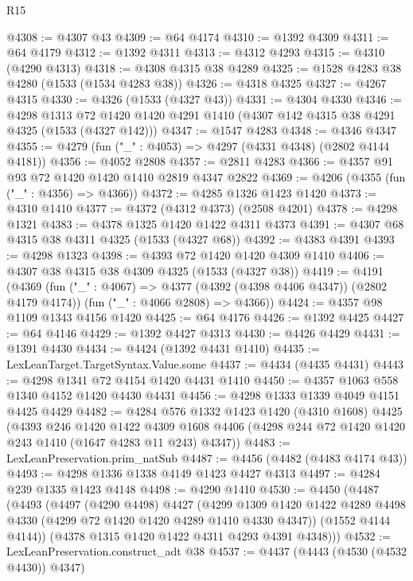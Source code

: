 \begin{lexlean}{R15}
\begin{coremodule}
@4308 := @4307 @43
@4309 := @64 @4174
@4310 := @1392 @4309
@4311 := @64 @4179
@4312 := @1392 @4311
@4313 := @4312 @4293
@4315 := @4310 (@4290 @4313)
@4318 := @4308 @4315 @38 @4289
@4325 := @1528 @4283 @38 @4280 (@1533 (@1534 @4283 @38))
@4326 := @4318 @4325
@4327 := @4267 @4315
@4330 := @4326 (@1533 (@4327 @43))
@4331 := @4304 @4330
@4346 := @4298
    @1313
    @72
    @1420
    @1420
    @4291
    @1410
    (@4307 @142 @4315 @38 @4291 @4325 (@1533 (@4327 @142)))
@4347 := @1547 @4283
@4348 := @4346 @4347
@4355 := @4279 (fun ("_" : @4053) => @4297 (@4331 @4348) (@2802 @4144 @4181))
@4356 := @4052 @2808
@4357 := @2811 @4283
@4366 := @4357 @91 @93 @72 @1420 @1420 @1410 @2819 @4347 @2822
@4369 := @4206 (@4355 (fun ("_" : @4356) => @4366))
@4372 := @4285 @1326 @1423 @1420
@4373 := @4310 @1410
@4377 := @4372 (@4312 @4373) (@2508 @4201)
@4378 := @4298 @1321
@4383 := @4378 @1325 @1420 @1422 @4311 @4373
@4391 := @4307 @68 @4315 @38 @4311 @4325 (@1533 (@4327 @68))
@4392 := @4383 @4391
@4393 := @4298 @1323
@4398 := @4393 @72 @1420 @1420 @4309 @1410
@4406 := @4307 @38 @4315 @38 @4309 @4325 (@1533 (@4327 @38))
@4419 := @4191
    (@4369
      (fun ("_" : @4067) => @4377 (@4392 (@4398 @4406 @4347)) (@2802 @4179 @4174))
      (fun ("_" : @4066 @2808) => @4366))
@4424 := @4357 @98 @1109 @1343 @4156 @1420
@4425 := @64 @4176
@4426 := @1392 @4425
@4427 := @64 @4146
@4429 := @1392 @4427 @4313
@4430 := @4426 @4429
@4431 := @1391 @4430
@4434 := @4424 (@1392 @4431 @1410)
@4435 := LexLeanTarget.TargetSyntax.Value.some
@4437 := @4434 (@4435 @4431)
@4443 := @4298 @1341 @72 @4154 @1420 @4431 @1410
@4450 := @4357 @1063 @558 @1340 @4152 @1420 @4430 @4431
@4456 := @4298 @1333 @1339 @4049 @4151 @4425 @4429
@4482 := @4284
    @576
    @1332
    @1423
    @1420
    (@4310 @1608)
    @4425
    (@4393
      @246
      @1420
      @1422
      @4309
      @1608
      @4406
      (@4298 @244 @72 @1420 @1420 @243 @1410 (@1647 @4283 @11 @243) @4347))
@4483 := LexLeanPreservation.prim_natSub
@4487 := @4456 (@4482 (@4483 @4174 @43))
@4493 := @4298 @1336 @1338 @4149 @1423 @4427 @4313
@4497 := @4284 @239 @1335 @1423 @4148
@4498 := @4290 @1410
@4530 := @4450
    (@4487
      (@4493
        (@4497
          (@4290 @4498)
          @4427
          (@4299
            @1309
            @1420
            @1422
            @4289
            @4498
            @4330
            (@4299 @72 @1420 @1420 @4289 @1410 @4330 @4347))
          (@1552 @4144 @4144))
        (@4378 @1315 @1420 @1422 @4311 @4293 @4391 @4348)))
@4532 := LexLeanPreservation.construct_adt @38
@4537 := @4437 (@4443 (@4530 (@4532 @4430)) @4347)

\end{coremodule}
\end{lexlean}
